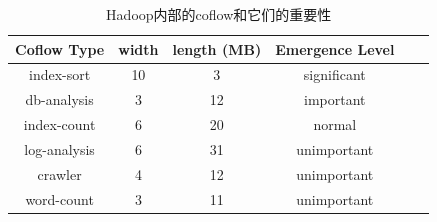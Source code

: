  
 \begin{table}[!htb]
\centering
\footnotesize
 \caption{Hadoop内部的coflow和它们的重要性} \label{Yosemite:measure2}
\begin{tabular}{|c|c|c|c|c|c|} \hline
\toprule
Coflow Type  &  width&length (MB)&Emergence Level\\
\midrule
index-sort    &10&3  &significant \\
db-analysis   &3&12     &  important \\
index-count   &6&20 &  normal\\
log-analysis   &6&31   &  unimportant \\
crawler  &4&12     &  unimportant \\
word-count  &3&11     &  unimportant\\
   \bottomrule
 \end{tabular}
 \end{table}
 
